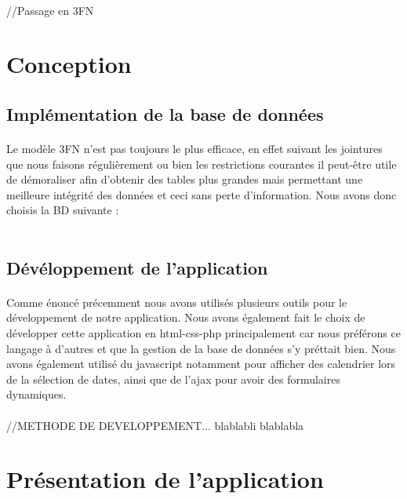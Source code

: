 \documentclass[a4paper, 12pt]{article}
\begin{document}
\paragraph{} //Passage en  3FN

\newpage

\section{Conception}
\subsection{Implémentation de la base de données}
\paragraph{}Le modèle 3FN n'est pas toujours le plus efficace, en effet suivant les jointures que nous faisons régulièrement ou bien les restrictions courantes il peut-être utile de démoraliser afin d'obtenir des tables plus grandes mais permettant une meilleure intégrité des données et ceci sans perte d'information. Nous avons donc choisis la BD suivante :
\\ \\

\newpage
\subsection{Dévéloppement de l'application}
\paragraph{}Comme énoncé précemment nous avons utilisés plusieurs outils pour le développement de notre application. Nous avons également fait le choix de développer cette application en html-css-php principalement car nous préférons ce langage à d'autres et que la gestion de la base de données s'y préttait bien. Nous avons également utilisé du javascript notamment pour afficher des calendrier lors de la sélection de dates, ainsi que de l'ajax pour avoir des formulaires dynamiques.
\paragraph{}//METHODE DE DEVELOPPEMENT... blablabli blablabla


\newpage

\section{Présentation de l'application}
\end{document}
